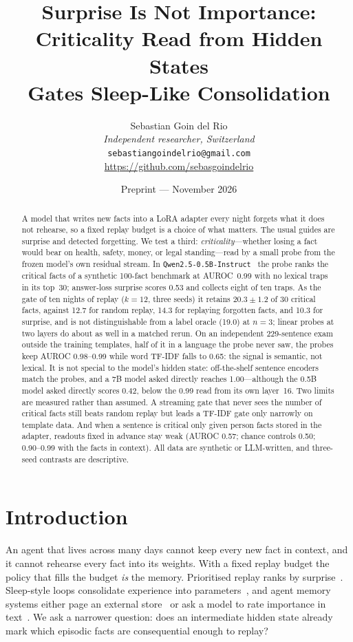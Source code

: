 \documentclass[11pt,a4paper]{article}
\title{Surprise Is Not Importance:\\
Criticality Read from Hidden States\\
Gates Sleep-Like Consolidation}
\author{Sebastian Goin del Rio\\
\textit{Independent researcher, Switzerland}\\
\texttt{sebastiangoindelrio@gmail.com}\\
\url{https://github.com/sebasgoindelrio}}
\date{Preprint --- November 2026}
\begin{document}
\maketitle
\thispagestyle{empty}
\pagestyle{plain}

\begin{abstract}
A model that writes new facts into a LoRA adapter every night forgets what it does not rehearse, so a fixed replay budget is a choice of what matters.
The usual guides are surprise and detected forgetting.
We test a third: \emph{criticality}---whether losing a fact would bear on health, safety, money, or legal standing---read by a small probe from the frozen model's own residual stream.
In \texttt{Qwen2.5-0.5B-Instruct}~\cite{qwen2025} the probe ranks the critical facts of a synthetic 100-fact benchmark at AUROC~0.99 with no lexical traps in its top~30; answer-loss surprise scores 0.53 and collects eight of ten traps.
As the gate of ten nights of replay ($k{=}12$, three seeds) it retains $20.3{\pm}1.2$ of 30 critical facts, against 12.7 for random replay, 14.3 for replaying forgotten facts, and 10.3 for surprise, and is not distinguishable from a label oracle (19.0) at $n{=}3$; linear probes at two layers do about as well in a matched rerun.
On an independent 229-sentence exam outside the training templates, half of it in a language the probe never saw, the probes keep AUROC 0.98--0.99 while word TF-IDF falls to 0.65: the signal is semantic, not lexical.
It is not special to the model's hidden state: off-the-shelf sentence encoders match the probes, and a 7B model asked directly reaches 1.00---although the 0.5B model asked directly scores 0.42, below the 0.99 read from its own layer~16.
Two limits are measured rather than assumed.
A streaming gate that never sees the number of critical facts still beats random replay but leads a TF-IDF gate only narrowly on template data.
And when a sentence is critical only given person facts stored in the adapter, readouts fixed in advance stay weak (AUROC 0.57; chance controls 0.50; 0.90--0.99 with the facts in context).
All data are synthetic or LLM-written, and three-seed contrasts are descriptive.
\end{abstract}

\section{Introduction}

An agent that lives across many days cannot keep every new fact in context, and it cannot rehearse every fact into its weights.
With a fixed replay budget the policy that fills the budget \emph{is} the memory.
Prioritised replay ranks by surprise~\cite{schaul2015per}.
Sleep-style loops consolidate experience into parameters~\cite{behrouz2026sleep,dennis2026nightly,han2026evaf}, and agent memory systems either page an external store~\cite{packer2023memgpt} or ask a model to rate importance in text~\cite{park2023generative}.
We ask a narrower question: does an intermediate hidden state already mark which episodic facts are consequential enough to replay?
\end{document}
